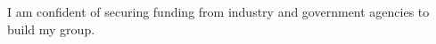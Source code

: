 \documentclass[10pt]{article}
\begin{document}
I am confident of securing funding from industry and government agencies to build my group.



\footnotesize


\end{document}
